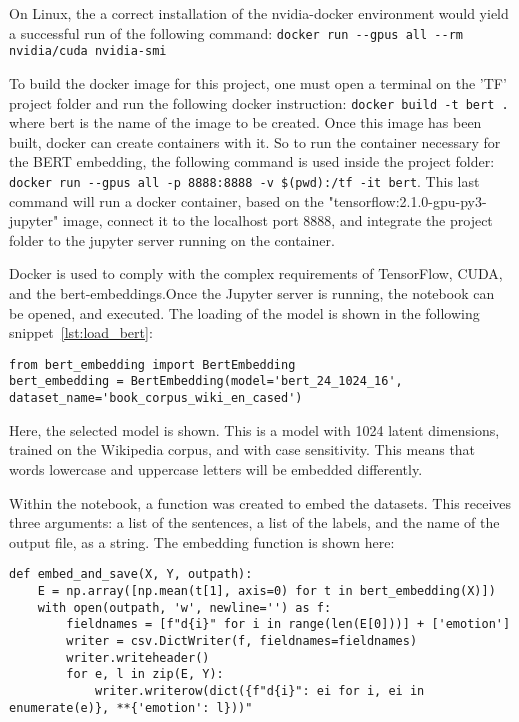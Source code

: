 On Linux, the a correct installation of the nvidia-docker environment would yield a successful run of the following command: \lstinline{docker run --gpus all --rm nvidia/cuda nvidia-smi}

To build the docker image for this project, one must open a terminal on the 'TF' project folder and run the following docker instruction: \lstinline{docker build -t bert .} where bert is the name of the image to be created.
Once this image has been built, docker can create containers with it. So to run the container necessary for the BERT embedding, the following command is used inside the project folder: \lstinline{docker run --gpus all -p 8888:8888 -v $(pwd):/tf -it bert}.
This last command will run a docker container, based on the "tensorflow:2.1.0-gpu-py3-jupyter" image, connect it to the localhost port 8888, and integrate the project folder to the jupyter server running on the container.

Docker is used to comply with the complex requirements of TensorFlow, CUDA, and the bert-embeddings.Once the Jupyter server is running, the notebook can be opened, and executed. The loading of the model is shown in the following snippet~\ref{lst:load_bert}:

\begin{lstlisting}[caption={Loading BERT},label=lst:load_bert,frame=single]
from bert_embedding import BertEmbedding
bert_embedding = BertEmbedding(model='bert_24_1024_16', dataset_name='book_corpus_wiki_en_cased')
\end{lstlisting}

Here, the selected model is shown. This is a model with 1024 latent dimensions, trained on the Wikipedia corpus, and with case sensitivity. This means that words lowercase and uppercase letters will be embedded differently.

Within the notebook, a function was created to embed the datasets. This receives three arguments: a list of the sentences, a list of the labels, and the name of the output file, as a string. The embedding function is shown here:

\begin{lstlisting}[caption={Embedding with BERT},label=lst:embed_bert,frame=single]
def embed_and_save(X, Y, outpath):
    E = np.array([np.mean(t[1], axis=0) for t in bert_embedding(X)])
    with open(outpath, 'w', newline='') as f:
        fieldnames = [f"d{i}" for i in range(len(E[0]))] + ['emotion']
        writer = csv.DictWriter(f, fieldnames=fieldnames)
        writer.writeheader()
        for e, l in zip(E, Y):
            writer.writerow(dict({f"d{i}": ei for i, ei in enumerate(e)}, **{'emotion': l}))"
\end{lstlisting}

